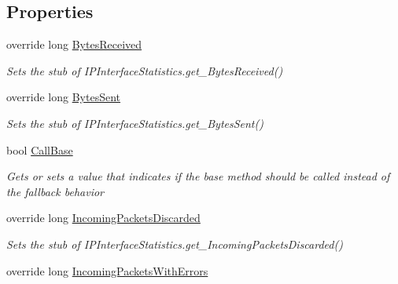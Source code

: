 \subsection*{Properties}
\begin{DoxyCompactItemize}
\item 
override long \hyperlink{class_system_1_1_net_1_1_network_information_1_1_fakes_1_1_stub_i_p_interface_statistics_ab70eed1d7eb869e5e6d9eb965bb77e29}{Bytes\-Received}
\begin{DoxyCompactList}\small\item\em Sets the stub of I\-P\-Interface\-Statistics.\-get\-\_\-\-Bytes\-Received()\end{DoxyCompactList}\item 
override long \hyperlink{class_system_1_1_net_1_1_network_information_1_1_fakes_1_1_stub_i_p_interface_statistics_a7f6ebb78c6142f44ece496efc0274b18}{Bytes\-Sent}
\begin{DoxyCompactList}\small\item\em Sets the stub of I\-P\-Interface\-Statistics.\-get\-\_\-\-Bytes\-Sent()\end{DoxyCompactList}\item 
bool \hyperlink{class_system_1_1_net_1_1_network_information_1_1_fakes_1_1_stub_i_p_interface_statistics_af61e99e2f13e5b69ef4a2b66c3edb4e6}{Call\-Base}
\begin{DoxyCompactList}\small\item\em Gets or sets a value that indicates if the base method should be called instead of the fallback behavior\end{DoxyCompactList}\item 
override long \hyperlink{class_system_1_1_net_1_1_network_information_1_1_fakes_1_1_stub_i_p_interface_statistics_afd4761b335e95e791382c9dc1d561889}{Incoming\-Packets\-Discarded}
\begin{DoxyCompactList}\small\item\em Sets the stub of I\-P\-Interface\-Statistics.\-get\-\_\-\-Incoming\-Packets\-Discarded()\end{DoxyCompactList}\item 
override long \hyperlink{class_system_1_1_net_1_1_network_information_1_1_fakes_1_1_stub_i_p_interface_statistics_a54e8509e717ae6b02304192212a6c6be}{Incoming\-Packets\-With\-Errors}

\end{DoxyCompactItemize}

